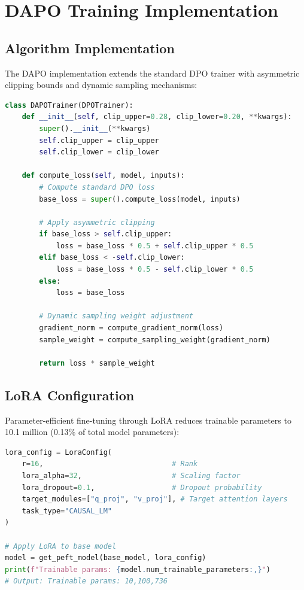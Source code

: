 \documentclass{report}
\begin{document}
\section{DAPO Training Implementation}

\subsection{Algorithm Implementation}

The DAPO implementation extends the standard DPO trainer with asymmetric clipping bounds and dynamic sampling mechanisms:

\begin{lstlisting}[language=Python, caption=DAPO loss computation]
class DAPOTrainer(DPOTrainer):
    def __init__(self, clip_upper=0.28, clip_lower=0.20, **kwargs):
        super().__init__(**kwargs)
        self.clip_upper = clip_upper
        self.clip_lower = clip_lower
    
    def compute_loss(self, model, inputs):
        # Compute standard DPO loss
        base_loss = super().compute_loss(model, inputs)
        
        # Apply asymmetric clipping
        if base_loss > self.clip_upper:
            loss = base_loss * 0.5 + self.clip_upper * 0.5
        elif base_loss < -self.clip_lower:
            loss = base_loss * 0.5 - self.clip_lower * 0.5
        else:
            loss = base_loss
            
        # Dynamic sampling weight adjustment
        gradient_norm = compute_gradient_norm(loss)
        sample_weight = compute_sampling_weight(gradient_norm)
        
        return loss * sample_weight
\end{lstlisting}

\subsection{LoRA Configuration}

Parameter-efficient fine-tuning through LoRA reduces trainable parameters to 10.1 million (0.13\% of total model parameters):

\begin{lstlisting}[language=Python, caption=LoRA configuration]
lora_config = LoraConfig(
    r=16,                              # Rank
    lora_alpha=32,                     # Scaling factor
    lora_dropout=0.1,                  # Dropout probability
    target_modules=["q_proj", "v_proj"], # Target attention layers
    task_type="CAUSAL_LM"
)

# Apply LoRA to base model
model = get_peft_model(base_model, lora_config)
print(f"Trainable params: {model.num_trainable_parameters:,}")
# Output: Trainable params: 10,100,736
\end{lstlisting}
\end{document}
